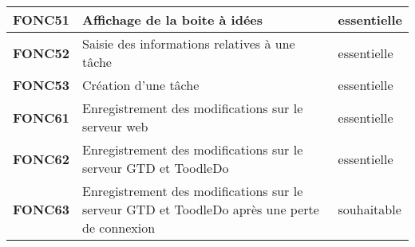 \begin{center}
\begin{tabular}{|p{3cm}|p{10cm}|p{3cm}|}
\textbf{FONC51} & Affichage de la boite à idées  & essentielle \\
\hline
\textbf{FONC52} & Saisie des informations relatives à une tâche  & essentielle\\
\hline
\textbf{FONC53} & Création d'une tâche  & essentielle\\

\hline
\textbf{FONC61} & Enregistrement des modifications sur le serveur web & essentielle\\
\hline
\textbf{FONC62} & Enregistrement des modifications sur le serveur GTD et ToodleDo & essentielle\\ 
\hline
\textbf{FONC63} & Enregistrement des modifications sur le serveur GTD et ToodleDo après une perte de connexion & souhaitable \\
\hline
\end{tabular}
\end{center}








